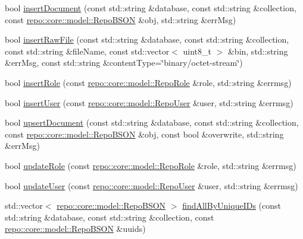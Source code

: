 \begin{DoxyCompactItemize}
\item 
bool \hyperlink{classrepo_1_1core_1_1handler_1_1_mongo_database_handler_a8b25a7efcb68ee809fd6b6ea20cb06ae}{insert\+Document} (const std\+::string \&database, const std\+::string \&collection, const \hyperlink{classrepo_1_1core_1_1model_1_1_repo_b_s_o_n}{repo\+::core\+::model\+::\+Repo\+B\+S\+O\+N} \&obj, std\+::string \&err\+Msg)
\item 
bool \hyperlink{classrepo_1_1core_1_1handler_1_1_mongo_database_handler_abaeb1612b1beb0945c72b153932d274f}{insert\+Raw\+File} (const std\+::string \&database, const std\+::string \&collection, const std\+::string \&file\+Name, const std\+::vector$<$ uint8\+\_\+t $>$ \&bin, std\+::string \&err\+Msg, const std\+::string \&content\+Type=\char`\"{}binary/octet-\/stream\char`\"{})
\item 
bool \hyperlink{classrepo_1_1core_1_1handler_1_1_mongo_database_handler_a1366832cc771fd306b0058ba4e1dcf30}{insert\+Role} (const \hyperlink{classrepo_1_1core_1_1model_1_1_repo_role}{repo\+::core\+::model\+::\+Repo\+Role} \&role, std\+::string \&errmsg)
\item 
bool \hyperlink{classrepo_1_1core_1_1handler_1_1_mongo_database_handler_acf2b49877a7d8a914e1a1d2aeb1b60e8}{insert\+User} (const \hyperlink{classrepo_1_1core_1_1model_1_1_repo_user}{repo\+::core\+::model\+::\+Repo\+User} \&user, std\+::string \&errmsg)
\item 
bool \hyperlink{classrepo_1_1core_1_1handler_1_1_mongo_database_handler_a81743d1af17889ad66a76b7ede0f420e}{upsert\+Document} (const std\+::string \&database, const std\+::string \&collection, const \hyperlink{classrepo_1_1core_1_1model_1_1_repo_b_s_o_n}{repo\+::core\+::model\+::\+Repo\+B\+S\+O\+N} \&obj, const bool \&overwrite, std\+::string \&err\+Msg)
\item 
bool \hyperlink{classrepo_1_1core_1_1handler_1_1_mongo_database_handler_a14c38b79dedf9e26bf802771367ebace}{update\+Role} (const \hyperlink{classrepo_1_1core_1_1model_1_1_repo_role}{repo\+::core\+::model\+::\+Repo\+Role} \&role, std\+::string \&errmsg)
\item 
bool \hyperlink{classrepo_1_1core_1_1handler_1_1_mongo_database_handler_a7fae7458d4261fc61a7415262813183d}{update\+User} (const \hyperlink{classrepo_1_1core_1_1model_1_1_repo_user}{repo\+::core\+::model\+::\+Repo\+User} \&user, std\+::string \&errmsg)
\item 
std\+::vector$<$ \hyperlink{classrepo_1_1core_1_1model_1_1_repo_b_s_o_n}{repo\+::core\+::model\+::\+Repo\+B\+S\+O\+N} $>$ \hyperlink{classrepo_1_1core_1_1handler_1_1_mongo_database_handler_a26cca6e23ce8e218fe5c6106bc91425a}{find\+All\+By\+Unique\+I\+Ds} (const std\+::string \&database, const std\+::string \&collection, const \hyperlink{classrepo_1_1core_1_1model_1_1_repo_b_s_o_n}{repo\+::core\+::model\+::\+Repo\+B\+S\+O\+N} \&uuids)

\end{DoxyCompactItemize}
